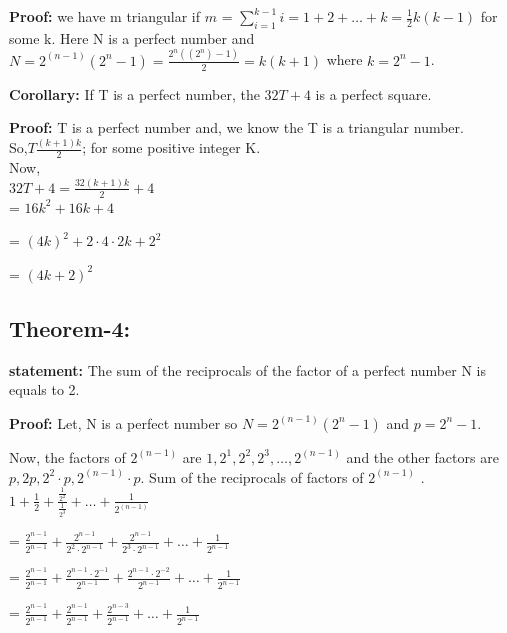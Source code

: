\documentclass[12pt,,a4paper]{article}
\begin{document}
\textbf{Proof:}  we have m triangular if \(m\) = $\sum\limits_{i=1}^{k-1} i = 1 + 2 + \ldots + k = \frac{1}{2}k(k-1)$ for some k. Here N is a perfect number and\(N = 2^{(n-1)}(2^n-1) = \frac{{2^n((2^n)-1)}}{2} = k(k+1)\) where \(k = 2^n-1\).\\
\vspace{10pt}

\textbf{Corollary:}  If  T is a perfect  number, the  $32T + 4$ is a perfect square.
 

\textbf{Proof:} T is a perfect number and, we know the T  is a triangular number.\\

So,\(T \frac{(k+1)k}{2}\); for some positive integer K.\\

Now,\\

\(32T+4 = \frac{32(k+1)k}{2} + 4\) \\

 = \(16k^2 + 16k + 4\)

 = \((4k)^2 + 2 \cdot 4 \cdot 2k + 2^2\)

= \((4k+2)^2\)
\vspace{10pt}\\

\subsection*{Theorem-4:}
\textbf{statement:} The sum of the reciprocals of the factor of a perfect number N is equals to 2.

\textbf{Proof:} Let, N is a perfect number so \(N = 2^{(n-1)}(2^n-1)\) and \(p = 2^n-1\).

Now, the factors of \(2^{(n-1)}\) are \(1, 2^1, 2^2, 2^3, \ldots, 2^{(n-1)}\) and the other factors are \(p, 2p, 2^2 \cdot p, 2^{(n-1)} \cdot p\).  Sum of the reciprocals of factors of \(2^{(n-1)}\) . \\
$1 + \frac{1}{2} + \frac{\frac{1}{2^2}}{\frac{1}{2^3}} + \ldots + \frac{1}{2^{(n-1)}}$

= $\frac{2^{n-1}}{2^{n-1}} + \frac{2^{n-1}}{2^2 \cdot 2^{n-1}} + \frac{2^{n-1}}{2^3 \cdot 2^{n-1}} + \ldots + \frac{1}{2^{n-1}}$

=  $\frac{2^{n-1}}{2^{n-1}} + \frac{2^{n-1} \cdot 2^{-1}}{2^{n-1}} + \frac{2^{n-1} \cdot 2^{-2}}{2^{n-1}} + \ldots + \frac{1}{2^{n-1}}$

=  $\frac{2^{n-1}}{2^{n-1}} + \frac{2^{n-1}}{2^{n-1}} + \frac{2^{n-3}}{2^{n-1}} + \ldots + \frac{1}{2^{n-1}}$
\end{document}
